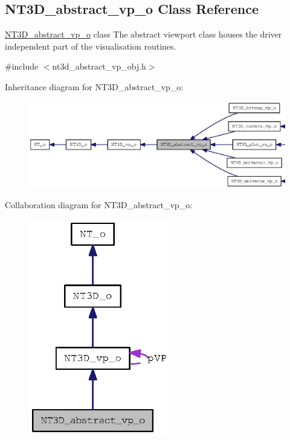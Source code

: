 \subsection{NT3D\_\-abstract\_\-vp\_\-o Class Reference}
\label{class_n_t3_d__abstract__vp__o}


\hyperlink{class_n_t3_d__abstract__vp__o}{NT3D\_\-abstract\_\-vp\_\-o} class The abstract viewport class houses the driver independent part of the visualisation routines.  




{\ttfamily \#include $<$nt3d\_\-abstract\_\-vp\_\-obj.h$>$}



Inheritance diagram for NT3D\_\-abstract\_\-vp\_\-o:
\nopagebreak
\begin{figure}[H]
\begin{center}
\leavevmode
\includegraphics[width=400pt]{class_n_t3_d__abstract__vp__o__inherit__graph}
\end{center}
\end{figure}


Collaboration diagram for NT3D\_\-abstract\_\-vp\_\-o:
\nopagebreak
\begin{figure}[H]
\begin{center}
\leavevmode
\includegraphics[width=174pt]{class_n_t3_d__abstract__vp__o__coll__graph}
\end{center}
\end{figure}

